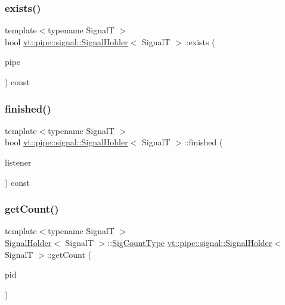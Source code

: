 \subsubsection{\texorpdfstring{exists()}{exists()}}
{\footnotesize\ttfamily template$<$typename SignalT $>$ \\
bool \hyperlink{structvt_1_1pipe_1_1signal_1_1_signal_holder}{vt\+::pipe\+::signal\+::\+Signal\+Holder}$<$ SignalT $>$\+::exists (\begin{DoxyParamCaption}\item[{\hyperlink{namespacevt_ac9852acda74d1896f48f406cd72c7bd3}{Pipe\+Type} const \&}]{pipe }\end{DoxyParamCaption}) const}

\mbox{\label{structvt_1_1pipe_1_1signal_1_1_signal_holder_aa2d3f4de74295a26df20f26e84f99c4e}} 
\subsubsection{\texorpdfstring{finished()}{finished()}}
{\footnotesize\ttfamily template$<$typename SignalT $>$ \\
bool \hyperlink{structvt_1_1pipe_1_1signal_1_1_signal_holder}{vt\+::pipe\+::signal\+::\+Signal\+Holder}$<$ SignalT $>$\+::finished (\begin{DoxyParamCaption}\item[{\hyperlink{structvt_1_1pipe_1_1signal_1_1_signal_holder_a68114d1ad5804c71e014736b18e41e08}{Listener\+Ptr\+Type}}]{listener }\end{DoxyParamCaption}) const}

\mbox{\label{structvt_1_1pipe_1_1signal_1_1_signal_holder_aefb0dca5bdcb08b867c24b29f1d48429}} 
\subsubsection{\texorpdfstring{get\+Count()}{getCount()}}
{\footnotesize\ttfamily template$<$typename SignalT $>$ \\
\hyperlink{structvt_1_1pipe_1_1signal_1_1_signal_holder}{Signal\+Holder}$<$ SignalT $>$\+::\hyperlink{structvt_1_1pipe_1_1signal_1_1_signal_holder_aced54515f402b63f6dea174e5b027c81}{Sig\+Count\+Type} \hyperlink{structvt_1_1pipe_1_1signal_1_1_signal_holder}{vt\+::pipe\+::signal\+::\+Signal\+Holder}$<$ SignalT $>$\+::get\+Count (\begin{DoxyParamCaption}\item[{\hyperlink{namespacevt_ac9852acda74d1896f48f406cd72c7bd3}{Pipe\+Type} const \&}]{pid }\end{DoxyParamCaption})}

